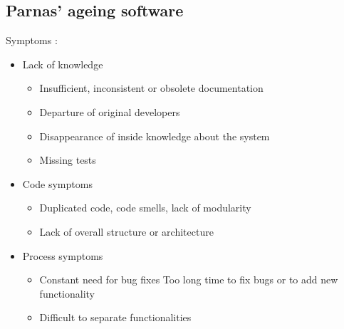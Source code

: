 \documentclass[a4paper,11pt]{report}
\begin{document}
	\subsection{Parnas' ageing software}
		Symptoms :
		\begin{itemize}
			\item Lack of knowledge
				\begin{itemize}
					\item Insufficient, inconsistent or
						obsolete documentation
					\item Departure of original 
						developers
					\item Disappearance of inside 
						knowledge about the system
					\item Missing tests
				\end{itemize}
			\item Code symptoms
				\begin{itemize}
					\item Duplicated code, code smells, 
						lack of modularity
					\item Lack of overall structure 
						or architecture
				\end{itemize}
			\item Process symptoms
				\begin{itemize}	
					\item Constant need for bug fixes
						Too long time to fix bugs or to 
						add new functionality
					\item Difficult to separate
						functionalities
				\end{itemize}
		\end{itemize}
	\newpage
\end{document}
